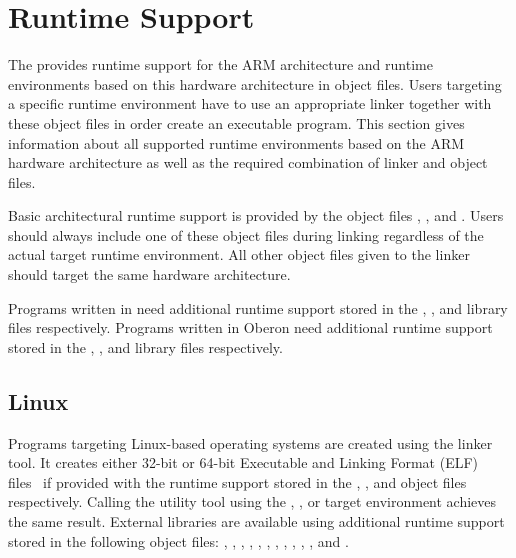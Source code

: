 \section{Runtime Support}

The \ecs{} provides runtime support for the ARM architecture and runtime environments based on this hardware architecture in object files.
Users targeting a specific runtime environment have to use an appropriate linker together with these object files in order create an executable program.
This section gives information about all supported runtime environments based on the ARM hardware architecture as well as the required combination of linker and object files.

Basic architectural runtime support is provided by the object files , ,  and .
Users should always include one of these object files during linking regardless of the actual target runtime environment.
All other object files given to the linker should target the same hardware architecture.

Programs written in \cpp{} need additional runtime support stored in the , ,  and  library files respectively.
Programs written in Oberon need additional runtime support stored in the , ,  and  library files respectively.
\seecpp\seeoberon

\subsection{Linux}

Programs targeting Linux-based operating systems are created using the  linker tool.
It creates either 32-bit or 64-bit Executable and Linking Format (ELF) files~\cite{elffile} if provided with the runtime support stored in the , ,  and  object files respectively.
Calling the  utility tool using the , ,  or  target environment achieves the same result.
External libraries are available using additional runtime support stored in the following object files: , , , , , , , , , , , and .

